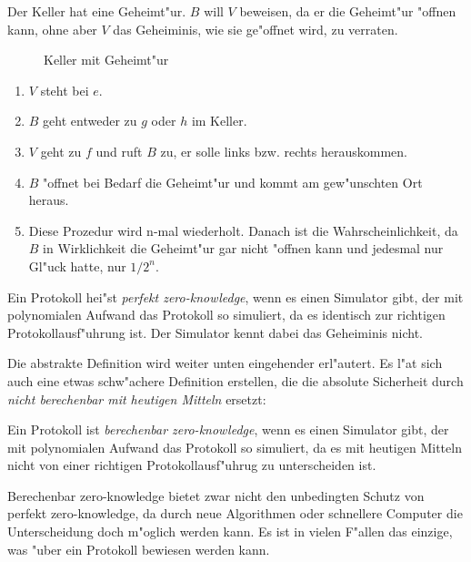 \begin{beispiel} 
Der Keller hat eine Geheimt"ur. $B$ will $V$ beweisen, da\3 er die
Geheimt"ur "offnen kann, ohne aber $V$ das Geheiminis, wie sie
ge"offnet wird, zu verraten.
  \begin{figure}[htb]
  \centerline{}
  \caption{Keller mit Geheimt"ur}
  \end{figure}
  \begin{enumerate}
    \item $V$ steht bei $e$.
    \item $B$ geht entweder zu $g$ oder $h$ im Keller.
    \item $V$ geht zu $f$ und ruft $B$ zu, er solle links bzw. 
          rechts herauskommen.
    \item $B$ "offnet bei Bedarf die Geheimt"ur und kommt am 
          gew"unschten Ort heraus.
    \item Diese Prozedur wird n-mal wiederholt. Danach ist die
          Wahrscheinlichkeit, da\3 $B$ in Wirklichkeit die Geheimt"ur
          gar nicht "offnen kann und jedesmal nur Gl"uck hatte, nur
          $1/2^n$.
  \end{enumerate}
\end{beispiel}

\begin{definition}
Ein Protokoll hei"st {\em perfekt zero-knowledge}, wenn es einen
Simulator gibt, der mit polynomialen Aufwand das Protokoll so
simuliert, da\3 es identisch zur richtigen Protokollausf"uhrung
ist. Der Simulator kennt dabei das Geheiminis nicht.
\end{definition}

Die abstrakte Definition wird weiter unten eingehender erl"autert. Es
l"a\3t sich auch eine etwas schw"achere Definition erstellen, die die
absolute Sicherheit durch {\em nicht berechenbar mit heutigen Mitteln}
ersetzt:

\begin{definition}
Ein Protokoll ist {\em berechenbar zero-knowledge}, wenn es einen
Simulator gibt, der mit polynomialen Aufwand das Protokoll so
simuliert, da\3 es mit heutigen Mitteln nicht von einer richtigen
Protokollausf"uhrug zu unterscheiden ist.
\end{definition}

Berechenbar zero-knowledge bietet zwar nicht den unbedingten Schutz von
perfekt zero-knowledge, da durch neue Algorithmen oder schnellere Computer die
Unterscheidung doch m"oglich werden kann. Es ist in vielen F"allen
das einzige, was "uber ein Protokoll bewiesen werden kann.

